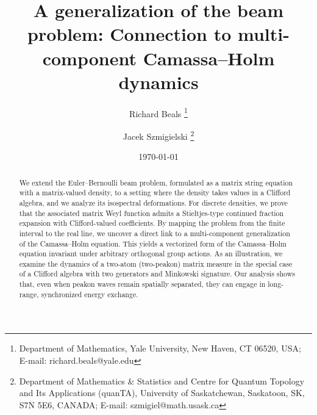 \documentclass[10pt,a4paper]{article}
\title{ A generalization of the beam problem: Connection to multi-component Camassa–Holm dynamics }
\author{Richard Beals \thanks{Department of Mathematics, Yale University,  New Haven, CT 06520, USA;
E-mail: richard.beals@yale.edu}\and Jacek Szmigielski \thanks{Department of Mathematics \& Statistics and Centre for Quantum Topology and Its Applications (quanTA), University of Saskatchewan, Saskatoon, SK, S7N 5E6, CANADA; 
  E-mail: szmigiel@math.usask.ca} }
\date{\today}
\numberwithin{equation}{section}
\theoremstyle{plain}
\theoremstyle{definition}
\begin{document}
\maketitle
\begin{abstract} 

We extend the Euler–Bernoulli beam problem, formulated as a matrix string equation with a matrix-valued density, to a setting where the density takes values in a Clifford algebra, and we analyze its isospectral deformations. For discrete densities, we prove that the associated matrix Weyl function admits a Stieltjes-type continued fraction expansion with Clifford-valued coefficients. By mapping the problem from the finite interval to the real line, we uncover a direct link to a multi-component generalization of the Camassa–Holm equation. This yields a vectorized form of the Camassa–Holm equation invariant under arbitrary orthogonal group actions. As an illustration, we examine the dynamics of a two-atom (two-peakon) matrix measure in the special case of a Clifford algebra with two generators and Minkowski signature. Our analysis shows that, even when peakon waves remain spatially separated, they can engage in long-range, synchronized energy exchange.

\end{abstract}
\end{document}
